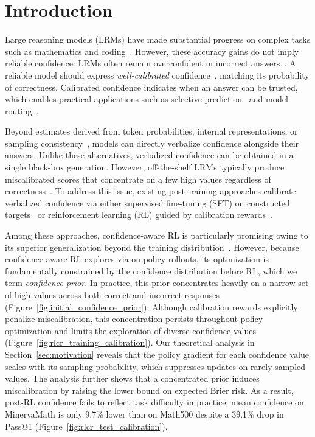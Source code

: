 \documentclass{article} %
\begin{document}
\section{Introduction}

Large reasoning models (LRMs) have made substantial progress on complex tasks such as mathematics and coding~\citep{guo2025deepseek,yang2025qwen3}.
However, these accuracy gains do not imply reliable confidence: LRMs often remain overconfident in incorrect answers~\citep{mei2025reasoning}.
A reliable model should express \emph{well-calibrated} confidence~\citep{guo2017calibration}, matching its probability of correctness.
Calibrated confidence indicates when an answer can be trusted, which enables practical applications such as selective prediction~\citep{shen2026provable} and model routing~\citep{hao2026racer}.

Beyond estimates derived from token probabilities, internal representations, or sampling consistency~\citep{luo2025your,srey2026signals,kuhn2023semantic}, 
models can directly verbalize confidence alongside their answers.
Unlike these alternatives, verbalized confidence can be obtained in a single black-box generation.
However, off-the-shelf LRMs typically produce miscalibrated scores that concentrate on a few high values regardless of correctness~\citep{mei2025reasoning,cacioli2026saturation}.
To address this issue, existing post-training approaches calibrate verbalized confidence via either supervised fine-tuning (SFT) on constructed targets~\citep{xu2024sayself,zhang2026lovec} or reinforcement learning (RL) guided by calibration rewards~\citep{damani2026beyond,ma2026decoupling}.

Among these approaches, confidence-aware RL is particularly promising owing to its superior generalization beyond the training distribution~\citep{chu2025sft}.
However, because confidence-aware RL explores via on-policy rollouts, its optimization is fundamentally constrained by the confidence distribution before RL, which we term \emph{confidence prior}.
In practice, this prior concentrates heavily on a narrow set of high values across both correct and incorrect responses (Figure~\ref{fig:initial_confidence_prior}).
Although calibration rewards explicitly penalize miscalibration, this concentration persists throughout policy optimization and limits the exploration of diverse confidence values (Figure~\ref{fig:rlcr_training_calibration}).
Our theoretical analysis in Section~\ref{sec:motivation} reveals that the policy gradient for each confidence value scales with its sampling probability, which suppresses updates on rarely sampled values.
The analysis further shows that a concentrated prior induces miscalibration by raising the lower bound on expected Brier risk.
As a result, post-RL confidence fails to reflect task difficulty in practice: mean confidence on MinervaMath is only 9.7\% lower than on Math500 despite a 39.1\% drop in Pass@1 (Figure~\ref{fig:rlcr_test_calibration}).
\end{document}
